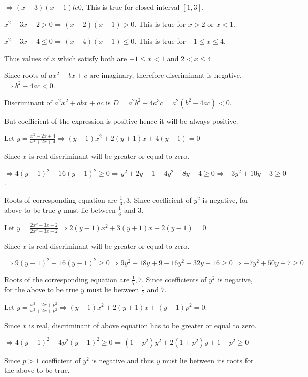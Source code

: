   $\Rightarrow (x - 3)(x - 1) le 0$, This is true for closed interval $[1, 3]$.
\item $x^2 - 3x + 2 > 0\Rightarrow (x - 2)(x - 1) > 0$. This is true for $x > 2$ or $x < 1$.

  $x^2 - 3x - 4 \le 0\Rightarrow (x - 4)(x + 1) \le 0$. This is true for $-1 \le x \le 4$.

  Thus values of $x$ which satisfy both are $-1 \le x < 1$ and $2 < x \le 4$.
\item Since roots of $ax^2 + bx + c$ are imaginary, therefore discriminant is negative. $\Rightarrow b^2 -
  4ac < 0$.

  Discriminant of $a^2x^2 + abx + ac$ is $D = a^2b^2 - 4a^3c = a^2(b^2 - 4ac) < 0$.

  But coefficient of the expression is positive hence it will be always positive.
\item Let $y = \frac{x^2 - 2x + 4}{x^2 + 2x + 4}\Rightarrow (y - 1)x^2 + 2(y + 1)x + 4(y - 1) = 0$

  Since $x$ is real discriminant will be greater or equal to zero.

  $\Rightarrow 4(y + 1)^2 - 16(y - 1)^2 \ge 0\Rightarrow y^2 + 2y + 1 - 4y^2 + 8y - 4 \ge 0\Rightarrow -3y^2
  + 10y - 3 \ge 0$.

  Roots of corresponding equation are $\frac{1}{3}, 3$. Since coefficient of $y^2$ is negative, for above to be true
  $y$ must lie between $\frac{1}{3}$ and $3$.
\item Let $y = \frac{2x^2 - 3x + 2}{2x^2 + 3x + 2}\Rightarrow 2(y - 1)x^2 + 3(y + 1)x + 2(y - 1) = 0$

  Since $x$ is real discriminant will be greater or equal to zero.

  $\Rightarrow 9(y + 1)^2 - 16(y - 1)^2 \ge 0\Rightarrow 9y^2 + 18y + 9 - 16y^2 + 32y - 16 \ge
  0\Rightarrow -7y^2 + 50y - 7 \ge 0$

  Roots of the corresponding equation are $\frac{1}{7}, 7$. Since coefficients of $y^2$ is negative, for the above to
  be true $y$ must lie between $\frac{1}{7}$ and $7$.
\item Let $y = \frac{x^2 - 2x + p^2}{x^2 + 2x + p^2}\Rightarrow (y - 1)x^2 + 2(y + 1)x + (y - 1)p^2 = 0$.

  Since $x$ is real, discriminant of above equation has to be greater or equal to zero.

  $\Rightarrow 4(y + 1)^2 - 4p^2(y - 1)^2 \ge 0\Rightarrow (1 - p^2)y^2 + 2(1 + p^2)y + 1 - p^2 \ge 0$

  Since $p > 1$ coefficient of $y^2$ is negative and thus $y$ must lie between its roots for
  the above to be true.


